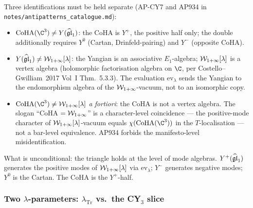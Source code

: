 \begin{remark}
\label{w17:rem:three-separations}
Three identifications must be held separate (AP-CY7 and AP934 in
\texttt{notes/antipatterns\_catalogue.md}):
\begin{itemize}
\item $\CoHA(\C^3) \neq Y(\gghone)$: the CoHA is $Y^+$, the positive half only;
the double additionally requires $Y^0$ (Cartan, Drinfeld-pairing) and $Y^-$
(opposite CoHA).
\item $Y(\widehat{\mathfrak{gl}}_1) \neq \mathcal{W}_{1+\infty}[\lambda]$: the Yangian is an associative
$E_1$-algebra; $\mathcal{W}_{1+\infty}[\lambda]$ is a vertex algebra (holomorphic factorisation
algebra on $\C$, per Costello--Gwilliam~2017 Vol~I Thm.~5.3.3). The evaluation
$\mathrm{ev}_\lambda$ sends the Yangian to the endomorphism algebra of the
$\mathcal{W}_{1+\infty}$-vacuum, not to an isomorphic copy.
\item $\CoHA(\C^3) \neq \Wilpha[\lambda]$ \emph{a fortiori}: the CoHA
is not a vertex algebra. The slogan ``CoHA $= \mathcal{W}_{1+\infty}$'' is a character-level
coincidence --- the positive-mode character of $\mathcal{W}_{1+\infty}[\lambda]$-vacuum
equals $\chi(\CoHA(\C^3))$ in the $T$-localisation --- not a bar-level
equivalence. AP934 forbids the manifesto-level misidentification.
\end{itemize}
What is unconditional: the triangle holds at the level of mode algebras.
$Y^+(\widehat{\mathfrak{gl}}_1)$ generates the positive modes of $\mathcal{W}_{1+\infty}[\lambda]$ via
$\mathrm{ev}_\lambda$; $Y^-$ generates negative modes; $Y^0$ is the Cartan.
The CoHA is the $Y^+$-half.
\end{remark}

\subsubsection{Two $\lambda$-parameters: $\lambda_{\mathrm{Tr}}$ vs.\ the CY$_3$ slice}
\label{w17:subsubsec:two-lambdas}

